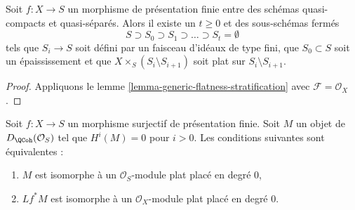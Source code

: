 \begin{lemma}
\label{lemma-generic-flatness-stratification-scheme}
Soit $f : X \to S$ un morphisme de présentation finie entre des schémas quasi-compacts
et quasi-séparés. Alors il existe un $t \geq 0$ et des sous-schémas
fermés
$$
S \supset S_0 \supset S_1 \supset \ldots \supset S_t = \emptyset
$$
tels que $S_i \to S$ soit défini par un faisceau d'idéaux de type fini,
que $S_0 \subset S$ soit un épaississement et que
$X \times_S (S_i \setminus S_{i + 1})$ soit plat sur $S_i \setminus S_{i + 1}$.
\end{lemma}

\begin{proof}
Appliquons le lemme \ref{lemma-generic-flatness-stratification}
avec $\mathcal{F} = \mathcal{O}_X$.
\end{proof}

\begin{lemma}
\label{lemma-flatness-criterion}
Soit $f : X \to S$ un morphisme surjectif de présentation finie.
Soit $M$ un objet de $D_\QCoh(\mathcal{O}_S)$ tel que
$H^i(M) = 0$ pour $i > 0$. Les conditions suivantes sont équivalentes :
\begin{enumerate}
\item $M$ est isomorphe à un $\mathcal{O}_S$-module plat
placé en degré $0$,
\item $Lf^*M$ est isomorphe à un $\mathcal{O}_X$-module plat
placé en degré $0$.
\end{enumerate}
\end{lemma}

